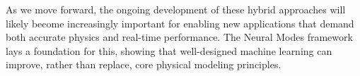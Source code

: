 \documentclass[11pt,a4paper]{article}
\numberwithin{equation}{section}
\begin{document}
As we move forward, the ongoing development of these hybrid approaches will likely become increasingly important for enabling new applications that demand both accurate physics and real-time performance. The Neural Modes framework lays a foundation for this, showing that well-designed machine learning can improve, rather than replace, core physical modeling principles.
\newpage
\printbibliography
\end{document}
